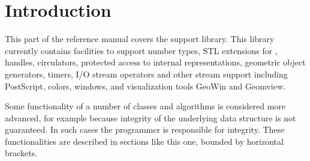 \cleardoublepage

\chapter{Introduction}



This part of the reference manual covers the support library. This library
currently contains facilities to support number types, STL extensions for 
\cgal, handles, circulators, protected access to internal representations, 
geometric object generators, timers, I/O stream operators and other stream 
support including PostScript, colors, windows, and visualization tools 
GeoWin and Geomview.

\begin{ccAdvanced}
Some functionality of a number of classes and algorithms is considered more
advanced, for example because integrity of the underlying data structure
is not guaranteed.
In such cases the programmer is responsible for integrity.
These functionalities are described in sections like this one, bounded by
horizontal brackets.
\end{ccAdvanced}

